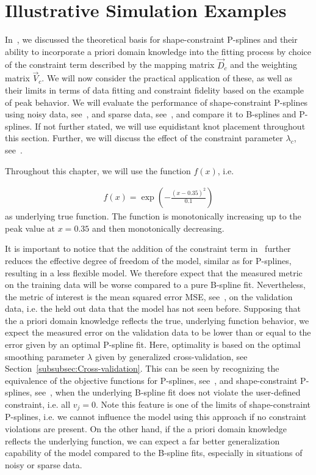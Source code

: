 \chapter{Illustrative Simulation Examples} \label{cha:practical-considerations}

In~, we discussed the theoretical basis for shape-constraint P-splines and their ability to incorporate a priori domain knowledge into the fitting process by choice of the constraint term described by the mapping matrix $\vec{D}_c$ and the weighting matrix $\vec{V}_c$. We will now consider the practical application of these, as well as their limits in terms of data fitting and constraint fidelity  based on the example of peak behavior. We will evaluate the performance of shape-constraint P-splines using noisy data, see~, and sparse data, see~, and compare it to B-splines and P-splines. If not further stated, we will use equidistant knot placement throughout this section. Further, we will discuss the effect of the constraint parameter $\lambda_c$, see~.

Throughout this chapter, we will use the function $f(x)$, i.e.

\begin{align} \label{eq:true-func-peak}
	f(x) = \exp\left(-\frac{(x - 0.35)^2}{0.1} \right)
\end{align}
% 
as underlying true function. The function is monotonically increasing up to the peak value at $x = 0.35$ and then monotonically decreasing.  

It is important to notice that the addition of the constraint term in~ further reduces the effective degree of freedom of the model, similar as for P-splines, resulting in a less flexible model. We therefore expect that the measured metric on the training data will be worse compared to a pure B-spline fit. Nevertheless, the metric of interest is the mean squared error MSE, see~, on the validation data, i.e. the held out data that the model has not seen before. Supposing that the a priori domain knowledge reflects the true, underlying function behavior, we expect the measured error on the validation data to be lower than or equal to the error given by an optimal P-spline fit. Here, optimality is based on the optimal smoothing parameter $\lambda$ given by generalized cross-validation, see Section~\ref{subsubsec:Cross-validation}. This can be seen by recognizing the equivalence of the objective functions for P-splines, see~, and shape-constraint P-splines, see~, when the underlying B-spline fit does not violate the user-defined constraint, i.e. all $v_j=0$. Note this feature is one of the limits of shape-constraint P-splines, i.e. we cannot influence the model using this approach if no constraint violations are present. On the other hand, if the a priori domain knowledge reflects the underlying function, we can expect a far better generalization capability of the model compared to the B-spline fits, especially in situations of noisy or sparse data.



